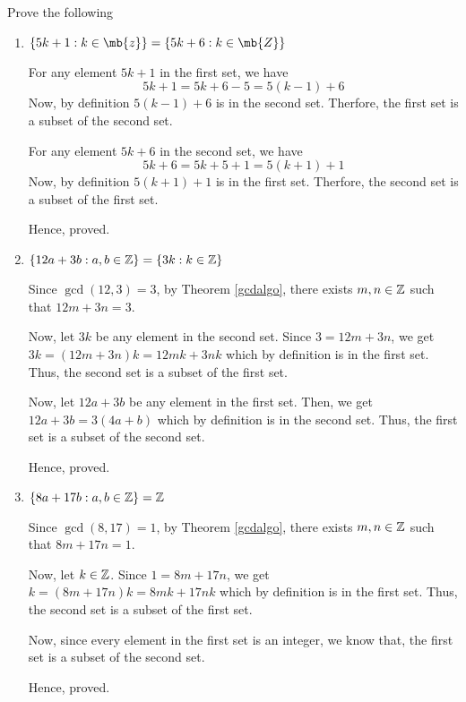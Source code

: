 \begin{problem}
	Prove the following
	\begin{enumerate}
		\item $\{5k+1 : k \in \mb{z} \} = \{ 5k + 6 : k \in \mb{Z} \}$
			
		\begin{solution}
			For any element $5k+1$ in the first set, we have 
			$$5k + 1 = 5k+6-5 = 5(k-1) + 6$$
			Now, by definition $5(k-1)+6$ is in the second set.
			Therfore, the first set is a subset of the second set.

			For any element $5k+6$ in the second set, we have
			$$5k+6 = 5k+5+1 = 5(k+1)+1$$
			Now, by definition $5(k+1)+1$ is in the first set.
			Therfore, the second set is a subset of the first set.

			Hence, proved.
		\end{solution}
		
	\item $\{ 12a + 3b : a, b \in \mathbb{Z} \} = \{ 3k : k \in \mathbb{Z} \}$

		\begin{solution}
			Since $\gcd(12, 3) = 3$, by Theorem \ref{gcdalgo}, there exists $m, n \in \mathbb{Z}$ such that $12m+3n = 3$.

			Now, let $3k$ be any element in the second set. Since $3 = 12m + 3n$, we get $3k = (12m+3n)k = 12mk + 3nk$ which by definition is in the first set.
			Thus, the second set is a subset of the first set.

			Now, let $12a + 3b$ be any element in the first set. Then, we get $12a+3b = 3(4a+b)$ which by definition is in the second set.
			Thus, the first set is a subset of the second set.

			Hence, proved.
		\end{solution}

	\item $\{8a+17b: a, b \in \mathbb{Z} \} = \mathbb{Z}$

		\begin{solution}
			Since $\gcd(8, 17) = 1$, by Theorem \ref{gcdalgo}, there exists $m, n \in \mathbb{Z}$ such that $8m+17n = 1$.

			Now, let $k \in \mathbb{Z}$. Since $1 = 8m + 17n$, we get $k = (8m+17n)k = 8mk + 17nk$ which by definition is in the first set.
			Thus, the second set is a subset of the first set.

			Now, since every element in the first set is an integer, we know that, the first set is a subset of the second set.

			Hence, proved.
		\end{solution}
	\end{enumerate}
\end{problem}


